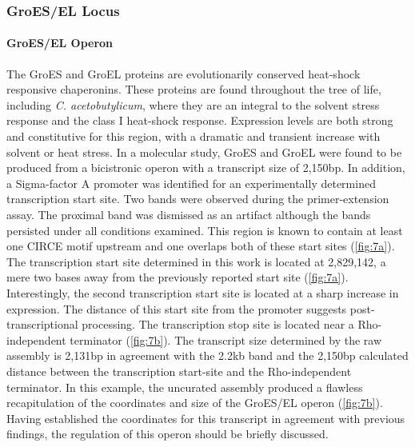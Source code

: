 \subsubsection{GroES/EL Locus}
\paragraph{GroES/EL Operon}
The GroES and GroEL proteins are evolutionarily conserved heat-shock responsive chaperonins. These proteins are found throughout the tree of life, including \textit{C. acetobutylicum}, where they are an integral to the solvent stress response\cite{73,74,75} and the class I heat-shock response\cite{42,73,74}. Expression levels are both strong and constitutive for this region, with a dramatic and transient increase with solvent or heat stress\cite{73,74}. In a molecular study, GroES and GroEL were found to be produced from a bicistronic operon with a transcript size of 2,150bp\cite{75}. In addition, a Sigma-factor A promoter was identified for an experimentally determined transcription start site. Two bands were observed during the primer-extension assay\cite{75}. The proximal band was dismissed as an artifact although the bands persisted under all conditions examined\cite{75}. This region is known to contain at least one CIRCE motif upstream\cite{76} and one overlaps both of these start sites (\ref{fig:7a})\cite{74}. The transcription start site determined in this work is located at 2,829,142, a mere two bases away from the previously reported start site\cite{75} (\ref{fig:7a}). Interestingly, the second transcription start site is located at a sharp increase in expression. The distance of this start site from the promoter suggests post-transcriptional processing. The transcription stop site is located near a Rho-independent terminator (\ref{fig:7b}). The transcript size determined by the raw assembly is 2,131bp in agreement with the 2.2kb band and the 2,150bp calculated distance between the transcription start-site and the Rho-independent terminator\cite{75}. In this example, the uncurated assembly produced a flawless recapitulation of the coordinates and size of the GroES/EL operon (\ref{fig:7b}). Having established the coordinates for this transcript in agreement with previous findings, the regulation of this operon should be briefly discussed.

